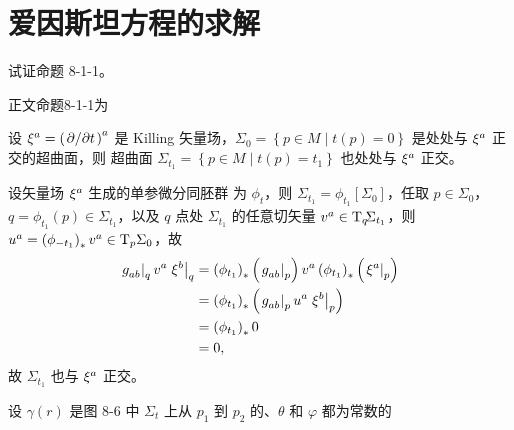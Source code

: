 
\chapter{爱因斯坦方程的求解}

\begin{xiti}
    \item 试证命题 8-1-1。
    
    \begin{zm}
        正文命题8-1-1为
        \begin{Proposition}
            设 $\tensor{\xi}{^a} = \tensor{\left( \pdv*{t} \right)}{^a} $ 是 Killing 矢量场，$\Sigma_0 = \left\{ p \in M \mid t(p) = 0 \right\}$ 是处处与 $\tensor{\xi}{^a}$ 正交的超曲面，则 超曲面 $\Sigma_{t_1} = \left\{ p \in M \mid t(p) = t_1 \right\}$ 也处处与 $\tensor{\xi}{^a}$ 正交。
        \end{Proposition}

        \begin{Proof}
            设矢量场 $\tensor{\xi}{^a}$ 生成的单参微分同胚群 为 $\phi_t$，则 $\Sigma_{t_1} = \phi_{t_1} \left[ \Sigma_0 \right]$，任取 $p \in \Sigma_0$，$q = \phi_{t_1}(p) \in \Sigma_{t_1}$，以及 $q$ 点处 $\Sigma_{t_1}$ 的任意切矢量 $\tensor{v}{^a} \in \TB[q]{\Sigma_{t_1}}$，则 $\tensor{u}{^a} = \left( \phi_{-t_1} \right)_* \tensor{v}{^a} \in \TBx[p]{\Sigma_0}$，故
            \begin{equation*}
                \begin{split}
                    \left.\tensor{g}{_a_b}\right|_{q} \tensor{v}{^a} \left.\tensor{\xi}{^b}\right|_q &= \left( \phi_{t_1} \right)_* \left( \left. \tensor{g}{_a_b} \right|_{p} \right) \tensor{v}{^a} \left( \phi_{t_1} \right)_* \left( \left. \tensor{\xi}{^a} \right|_p \right)\\
                    &= \left( \phi_{t_1} \right)_* \left( \left. \tensor{g}{_a_b} \right|_p \tensor{u}{^a} \left. \tensor{\xi}{^b} \right|_p \right)\\
                    &= \left( \phi_{t_1} \right)_* 0\\
                    &= 0,
                \end{split}
            \end{equation*}
            故 $\Sigma_{t_1}$ 也与 $\tensor{\xi}{^a}$ 正交。
        \end{Proof}  
    \end{zm}
    
    \item 设 $\gamma(r)$ 是图 8-6 中 $\Sigma_{t}$ 上从 $p_1$ 到 $p_2$ 的、$\theta$ 和 $\varphi$ 都为常数的
\end{xiti}

